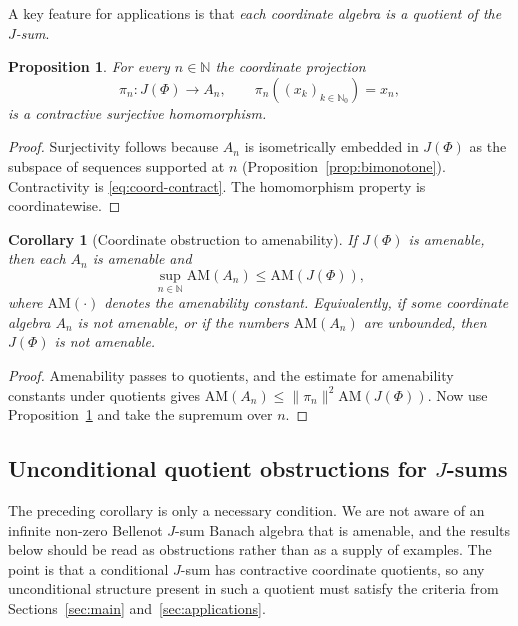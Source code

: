 \documentclass[reqno]{amsart}
\theoremstyle{plain}
\newtheorem{proposition}[theorem]{Proposition}
\newtheorem{corollary}[theorem]{Corollary}
\theoremstyle{definition}
\theoremstyle{remark}
\newcommand{\N}{\mathbb{N}}
\renewcommand{\le}{\leqslant}
\begin{document}
A key feature for applications is that \emph{each coordinate algebra is a
quotient of the $J$-sum}.

\begin{proposition}\label{prop:coord-quot}
For every $n\in\N$ the coordinate projection
\[
\pi_n\colon J(\Phi)\to A_n,\qquad \pi_n((x_k)_{k\in\N_0})=x_n,
\]
is a contractive surjective homomorphism.
\end{proposition}

\begin{proof}
Surjectivity follows because $A_n$ is isometrically embedded in $J(\Phi)$ as the
subspace of sequences supported at $n$ (Proposition~\ref{prop:bimonotone}).
Contractivity is \eqref{eq:coord-contract}.  The homomorphism property is
coordinatewise.
\end{proof}

\begin{corollary}[Coordinate obstruction to amenability]\label{cor:amenable-coordinates}
If $J(\Phi)$ is amenable, then each $A_n$ is amenable and
\[
\sup_{n\in\N}\mathrm{AM}(A_n)\le \mathrm{AM}(J(\Phi)),
\]
where $\mathrm{AM}(\cdot)$ denotes the amenability constant.  Equivalently, if some
coordinate algebra $A_n$ is not amenable, or if the numbers $\mathrm{AM}(A_n)$ are
unbounded, then $J(\Phi)$ is not amenable.
\end{corollary}

\begin{proof}
Amenability passes to quotients, and the estimate for amenability constants under
quotients gives $\mathrm{AM}(A_n)\le \|\pi_n\|^2\mathrm{AM}(J(\Phi))$.
Now use Proposition~\ref{prop:coord-quot} and take the supremum over $n$.
\end{proof}

\subsection{Unconditional quotient obstructions for $J$-sums}\label{subsec:Esums-inside-J}

The preceding corollary is only a necessary condition.  We are not aware of an
infinite non-zero Bellenot $J$-sum Banach algebra that is amenable, and the results
below should be read as obstructions rather than as a supply of examples.  The
point is that a conditional $J$-sum has contractive coordinate quotients, so any
unconditional structure present in such a quotient must satisfy the criteria from
Sections~\ref{sec:main} and~\ref{sec:applications}.
\end{document}
